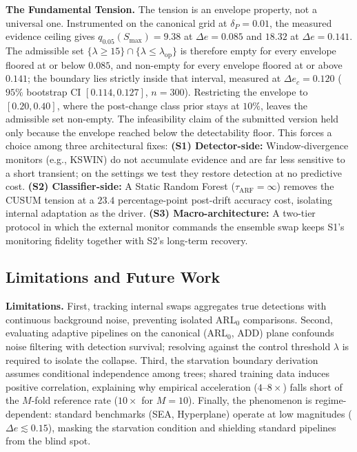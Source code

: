 \documentclass[10pt,conference]{IEEEtran}
\theoremstyle{definition}
\newcommand{\DeltaPtext}{0.01}               %
\newcommand{\LambdaFA}{15}                   %
\newcommand{\EnvLo}{0.20}\newcommand{\EnvHi}{0.40}
\newcommand{\DeFloorLo}{0.085}\newcommand{\DeFloorHi}{0.141}
\newcommand{\QlowFloorLo}{9.38}\newcommand{\QlowFloorHi}{18.32}
\newcommand{\DeCrit}{0.120}                  %
\newcommand{\DeCritCI}{[0.114, 0.127]}       %
\begin{document}
\textbf{The Fundamental Tension.} The tension is an envelope property, not a universal one. Instrumented on the canonical grid at $\delta_P = \DeltaPtext$, the measured evidence ceiling gives $q_{0.05}(S_{\max}) = \QlowFloorLo$ at $\Delta e = \DeFloorLo$ and $\QlowFloorHi$ at $\Delta e = \DeFloorHi$. The admissible set $\{\lambda \ge \LambdaFA\} \cap \{\lambda \le \lambda_{\mathrm{op}}\}$ is therefore empty for every envelope floored at or below $\DeFloorLo$, and non-empty for every envelope floored at or above $\DeFloorHi$; the boundary lies strictly inside that interval, measured at $\Delta e_c = \DeCrit$ ($95\%$ bootstrap CI $\DeCritCI$, $n=300$). Restricting the envelope to $[\EnvLo, \EnvHi]$, where the post-change class prior stays at $10\%$, leaves the admissible set non-empty. The infeasibility claim of the submitted version held only because the envelope reached below the detectability floor. This forces a choice among three architectural fixes:
\textbf{(S1) Detector-side:} Window-divergence monitors (e.g., KSWIN) do not accumulate evidence and are far less sensitive to a short transient; on the settings we test they restore detection at no predictive cost.
\textbf{(S2) Classifier-side:} A Static Random Forest ($\tau_{\mathrm{ARF}} = \infty$) removes the CUSUM tension at a $23.4$ percentage-point post-drift accuracy cost, isolating internal adaptation as the driver.
\textbf{(S3) Macro-architecture:} A two-tier protocol in which the external monitor commands the ensemble swap keeps S1's monitoring fidelity together with S2's long-term recovery.

\subsection{Limitations and Future Work}\label{sec:limitations}
\textbf{Limitations.} First, tracking internal swaps aggregates true detections with continuous background noise, preventing isolated ARL$_0$ comparisons. Second, evaluating adaptive pipelines on the canonical (ARL$_0$, ADD) plane confounds noise filtering with detection survival; resolving against the control threshold $\lambda$ is required to isolate the collapse. Third, the starvation boundary derivation assumes conditional independence among trees; shared training data induces positive correlation, explaining why empirical acceleration ($4$--$8\times$) falls short of the $M$-fold reference rate ($10\times$ for $M{=}10$). Finally, the phenomenon is regime-dependent: standard benchmarks (SEA, Hyperplane) operate at low magnitudes ($\Delta e \lesssim 0.15$), masking the starvation condition and shielding standard pipelines from the blind spot.
\end{document}
